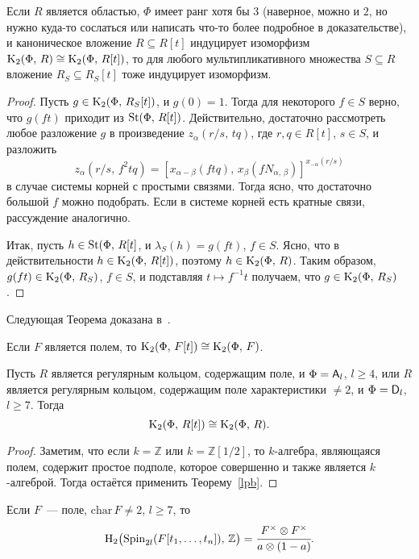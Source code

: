 \documentclass[oneside, 11pt]{amsart} \pdfoutput=1
\begin{document}
\begin{lemma}
\label{k2hil}
Если $R$ является областью, $\Phi$ имеет ранг хотя бы $3$ {\rm(}наверное, можно и $2$, но нужно куда-то сослаться или написать что-то более подробное в доказательстве{\rm)}, и каноническое вложение $R\subseteq R[t]$ индуцирует изоморфизм ${\mathrm{K}}_2(\Phi,\,R)\cong{\mathrm{K}}_2(\Phi,\,R[t])$, то для любого мультипликативного множества $S\subseteq R$ вложение $R_S\subseteq R_S[t]$ тоже индуцирует изоморфизм.
\end{lemma}
\begin{proof}
Пусть $g\in{\mathrm{K}}_2(\Phi,\,R_S[t])$, и $g(0)=1$. Тогда для некоторого $f\in S$ верно, что $g(ft)$ приходит из $\mathop{\mathrm{St}}\nolimits(\Phi,\,R[t])$. Действительно, достаточно рассмотреть любое разложение $g$ в произведение $z_{\alpha}(r/s,\,tq)$, где $r,q\in R[t]$, $s\in S$, и разложить
$$
z_{\alpha}(r/s,\,f^2tq)=[x_{\alpha-\beta}(ftq),\,x_{\beta}(fN_{\alpha,\,\beta})]^{x_{-\alpha}(r/s)}
$$
в случае системы корней с простыми связями. Тогда ясно, что достаточно большой $f$ можно подобрать. Если в системе корней есть кратные связи, рассуждение аналогично.

Итак, пусть $h\in\mathop{\mathrm{St}}\nolimits(\Phi,\,R[t]$, и $\lambda_S(h)=g(ft)$, $f\in S$. Ясно, что в действительности $h\in{\mathrm{K}}_2(\Phi,\,R[t])$, поэтому $h\in{\mathrm{K}}_2(\Phi,\,R)$. Таким образом, $g(ft)\in{\mathrm{K}}_2(\Phi,\,R_S)$, $f\in S$, и подставляя $t\mapsto f^{-1}t$ получаем, что $g\in{\mathrm{K}}_2(\Phi,\,R_S)$.
\end{proof}

Следующая Теорема доказана в~\cite[Korollar von Satz 1]{Re75}.

\begin{theorem}
Если $F$ является полем, то ${\mathrm{K}}_2(\Phi,\,F[t])\cong{\mathrm{K}}_2(\Phi,\,F)$.
\end{theorem}

\begin{theorem} \label{theorem:LP-for-K2}
Пусть $R$ является регулярным кольцом, содержащим поле, и $\Phi=\mathsf{A}_l$, $l\geq4$, или $R$ является регулярным кольцом, содержащим поле характеристики $\neq2$, и $\Phi=\mathsf{D}_l$, $l\geq7$. Тогда
$$
{\mathrm{K}}_2(\Phi,\,R[t])\cong{\mathrm{K}}_2(\Phi,\,R).
$$
\end{theorem}
\begin{proof}
Заметим, что если $k=\mathbb Z$ или $k=\mathbb Z[1/2]$, то $k$-алгебра, являющаяся полем, содержит простое подполе, которое совершенно и также является $k$-алгеброй. Тогда остаётся применить Теорему~\ref{lpb}.
\end{proof}

\begin{corollary}
Если $F$~--- поле, $\mathrm{char}\,F\neq2$, $l\geq7$, то
$$
\mathrm H_2\big(\mathrm{Spin}_{2l}(F[t_1,\ldots,t_n]),\,\mathbb Z\big)=\cfrac{F^\times\otimes F^\times}{a\otimes(1-a)}.
$$
\end{corollary}
\end{document}

